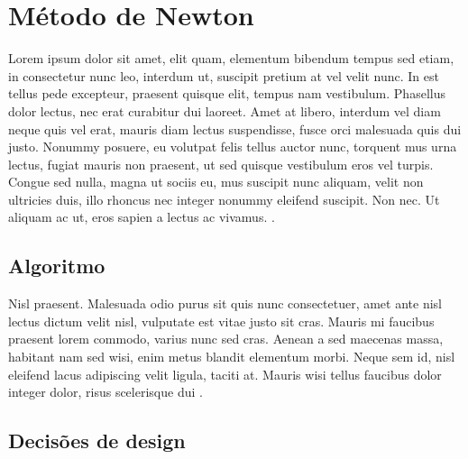 
\chapter{Método de Newton}\label{partes:newtonMethod}

  Lorem ipsum dolor sit amet, elit quam, elementum bibendum tempus sed etiam, in consectetur nunc leo, interdum ut, suscipit pretium at vel velit nunc. In est tellus pede excepteur, praesent quisque elit, tempus nam vestibulum. Phasellus dolor lectus, nec erat curabitur dui laoreet. Amet at libero, interdum vel diam neque quis vel erat, mauris diam lectus suspendisse, fusce orci malesuada quis dui justo. Nonummy posuere, eu volutpat felis tellus auctor nunc, torquent mus urna lectus, fugiat mauris non praesent, ut sed quisque vestibulum eros vel turpis. Congue sed nulla, magna ut sociis eu, mus suscipit nunc aliquam, velit non ultricies duis, illo rhoncus nec integer nonummy eleifend suscipit. Non nec. Ut aliquam ac ut, eros sapien a lectus ac vivamus. \citet{einstein}.

  \section{Algoritmo}
  \label{sec:alg}

    Nisl praesent. Malesuada odio purus sit quis nunc consectetuer, amet ante nisl lectus dictum velit nisl, vulputate est vitae justo sit cras. Mauris mi faucibus praesent lorem commodo, varius nunc sed cras. Aenean a sed maecenas massa, habitant nam sed wisi, enim metus blandit elementum morbi. Neque sem id, nisl eleifend lacus adipiscing velit ligula, taciti at. Mauris wisi tellus faucibus dolor integer dolor, risus scelerisque dui \citet*{latexcompanion}.

  \section{Decisões de design}
  \label{sec:design}

